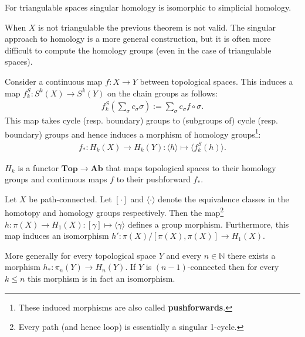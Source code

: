     \begin{theorem}
        For triangulable spaces singular homology is isomorphic to simplicial homology.
    \end{theorem}
    \begin{remark}
        When $X$ is not triangulable the previous theorem is not valid. The singular approach to homology is a more general construction, but it is often more difficult to compute the homology groups (even in the case of triangulable spaces).
    \end{remark}

    \begin{property}
        Consider a continuous map $f:X\rightarrow Y$ between topological spaces. This induces a map $f_k^S:S^k(X)\rightarrow S^k(Y)$ on the chain groups as follows:
        \begin{gather}
            f_k^S\left(\sum_\sigma c_\sigma\sigma\right) := \sum_\sigma c_\sigma f\circ\sigma.
        \end{gather}
        This map takes cycle (resp. boundary) groups to (subgroups of) cycle (resp. boundary) groups and hence induces a morphism of homology groups\footnote{These induced morphisms are also called \textbf{pushforwards}.}:
        \begin{gather}
            f_\ast:H_k(X)\rightarrow H_k(Y):\langle h \rangle\mapsto \langle f_k^S(h) \rangle.
        \end{gather}
    \end{property}
    \begin{result}
        $H_k$ is a functor $\mathbf{Top}\rightarrow\mathbf{Ab}$ that maps topological spaces to their homology groups and continuous maps $f$ to their pushforward $f_\ast$.
    \end{result}

    \begin{theorem}[Hurewicz]
        Let $X$ be path-connected. Let $[\cdot]$ and $\langle\cdot\rangle$ denote the equivalence classes in the homotopy and homology groups respectively. Then the map\footnote{Every path (and hence loop) is essentially a singular 1-cycle.} $h:\pi(X)\rightarrow H_1(X):[\gamma]\mapsto\langle\gamma\rangle$ defines a group morphism. Furthermore, this map induces an isomorphism $h':\pi(X)/[\pi(X), \pi(X)]\rightarrow H_1(X)$.

        More generally for every topological space $Y$ and every $n\in\mathbb{N}$ there exists a morphism $h_*:\pi_n(Y)\rightarrow H_n(Y)$. If $Y$ is $(n-1)$-connected then for every $k\leq n$ this morphism is in fact an isomorphism.
    \end{theorem}


